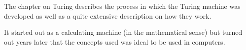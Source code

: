 \documentclass{article}
\begin{document}
   The chapter on Turing describes the process in which the Turing machine was
   developed as well as a quite extensive description on how they work.

   It started out as a calculating machine (in the mathematical sense) but turned out years later that the
   concepts used was ideal to be used in computers.
\end{document}
